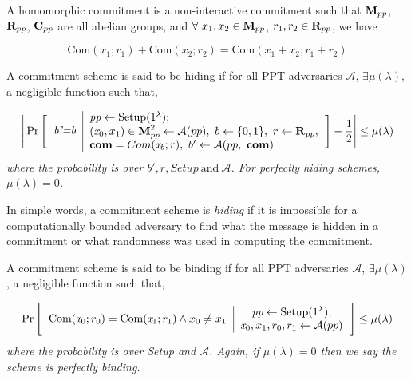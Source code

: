 \begin{defn}
    A homomorphic commitment is a non-interactive commitment such that ${\normalfont \textbf{M}_{pp}}$, ${\normalfont \textbf{R}_{pp}}$, ${\normalfont \textbf{C}_{pp}}$ are all abelian groups, and $\forall \ x_1, x_2 \in {\normalfont \textbf{M}_{pp}}$, $r_1, r_2 \in {\normalfont \textbf{R}_{pp}}$, we have 
\end{defn}
\begin{equation*}
    \text{Com}(x_1; r_1) + \text{Com}(x_2; r_2) = \text{Com}(x_1+ x_2; r_1+r_2)
\end{equation*}

\begin{defn}
    A commitment scheme is said to be hiding if for all PPT adversaries $\mathcal{A}$, $\exists \mu(\lambda)$, a negligible function such that,  
\end{defn}
\begin{equation*}
        \Bigg|
        \Pr
        \Bigg[
        \begin{tabular}{c | l}
             \multirow{3}{*}{$\textit{b'=b}$} 
             &
             $\textit{pp} \leftarrow \text{Setup}(1^{\lambda})$;\\
             &
             $(\textit{x}_0,x_1) \in \text{\textbf{M}}_{pp}^2 \leftarrow \mathcal{A}(pp), \
             b \leftarrow \{0,1\}, \ 
             r \leftarrow \text{\textbf{R}}_{pp},$ \\
             &
             $\textbf{com} = Com(\textit{x}_b; r),\ b' \leftarrow \mathcal{A}(pp, \ \textbf{com})$
        \end{tabular}
        \Bigg]
        - \frac{1}{2}
        \Bigg|
        \leq \mu(\lambda)
\end{equation*}
\textit{where the probability is over $b', r, Setup \ \text{and} \ \mathcal{A}$. For perfectly hiding schemes, $\mu(\lambda)=0$.}

In simple words, a commitment scheme is \textit{hiding} if it is impossible for a computationally bounded adversary to find what the message is hidden in a commitment or what randomness was used in computing the commitment.

\begin{defn}
    A commitment scheme is said to be binding if for all PPT adversaries $\mathcal{A}$, $\exists \mu(\lambda)$, a negligible function such that,
\end{defn}
\begin{equation*}
        \Pr 
        \Bigg[
        \begin{tabular}{c | c}
             \multirow{2}{*}{$\text{Com}(\textit{x}_0;r_0)= \text{Com}(\textit{x}_1;r_1) \wedge x_0 \neq x_1$} 
             &
             $\textit{pp} \leftarrow \text{Setup}(1^{\lambda})$,\\
             &
             $\textit{x}_0, x_1, r_0, r_1 \leftarrow \mathcal{A}(pp)$
        \end{tabular}
        \Bigg] 
        \leq \mu(\lambda)
\end{equation*}
\textit{where the probability is over Setup and $\mathcal{A}$. Again, if $\mu(\lambda)=0$ then we say the scheme is perfectly binding.}

